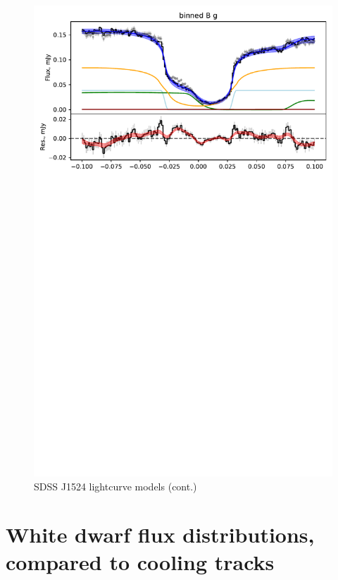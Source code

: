\begin{figure}
    \centering
    \includegraphics[width=\textwidth]{figures/results/SDSS1524/SDSS1524_4.pdf}
    \caption{SDSS J1524 lightcurve models (cont.)}
    \label{fig:SDSS1524 all lightcurves cont 3}
\end{figure}


\section{White dwarf flux distributions, compared to cooling tracks}
\label{appendix:white dwarf fluxes}

